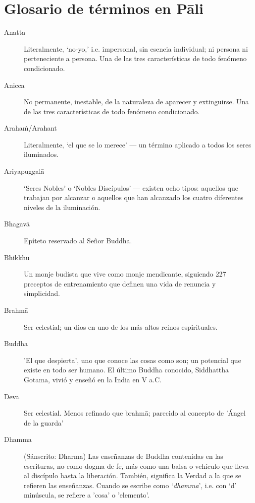 \chapter{Glosario de términos en Pāli }

\enlargethispage{2\baselineskip}

\begin{description}

\item[Anatta] Literalmente, `no-yo,' i.e. impersonal, sin esencia individual;
 ni persona ni perteneciente a persona. Una de las tres características de todo fenómeno condicionado.

\item[Anicca] No permanente, inestable, de la naturaleza de aparecer y extinguirse. Una de las tres características de todo fenómeno condicionado.

\item[Arahaṁ/Arahant] Literalmente, ‘el que se lo merece’ --- un término aplicado a todos los seres iluminados. 

\item[Ariyapuggalā] ‘Seres Nobles’ o ‘Nobles Discípulos’ --- existen ocho tipos: aquellos que trabajan por alcanzar o aquellos que han alcanzado los cuatro diferentes niveles de la iluminación.

\item[Bhagavā] Epíteto reservado al Señor Buddha.

\item[Bhikkhu] Un monje budista que vive como monje mendicante, siguiendo 227 preceptos de entrenamiento que definen una vida de renuncia y simplicidad.

\item[Brahmā] Ser celestial; un dios en uno de los más altos reinos espirituales.

\item[Buddha] 'El que despierta', uno que conoce las cosas como son; un potencial que existe en todo ser humano. El último Buddha conocido,
  Siddhattha Gotama, vivió y enseñó en la India en V a.C.

\item[Deva] Ser celestial. Menos refinado que brahmā; parecido al concepto de 'Ángel de la guarda'

\item[Dhamma] (Sánscrito: Dharma) Las enseñanzas de Buddha contenidas en las escrituras, no como dogma de fe, más como una balsa o vehículo que lleva al discípulo hasta la liberación. También, significa la Verdad a la que se refieren las enseñanzas. Cuando se escribe como ‘\emph{dhamma}’, i.e. con `d' minúscula, se refiere a 'cosa’ o 'elemento'.


\end{description}
